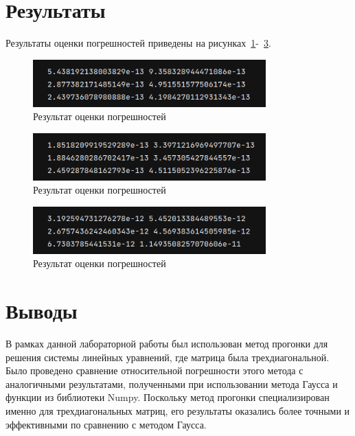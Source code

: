 \documentclass[a4paper, 14pt]{extarticle}
\begin{document}
\section{Результаты}

Результаты оценки погрешностей приведены на рисунках~\ref{fig:img1}-~\ref{fig:img3}.

\begin{figure}[H]
\centering
\includegraphics[width=0.8\textwidth]{images/res1.png}
\caption{Результат оценки погрешностей}
\label{fig:img1}
\end{figure}


\begin{figure}[H]
\centering
\includegraphics[width=0.8\textwidth]{images/res2.png}
\caption{Результат оценки погрешностей}
\label{fig:img2}
\end{figure}


\begin{figure}[H]
\centering
\includegraphics[width=0.8\textwidth]{images/res3.png}
\caption{Результат оценки погрешностей}
\label{fig:img3}
\end{figure}


\section{Выводы}
В рамках данной лабораторной работы был использован метод прогонки для решения системы линейных уравнений, где матрица была трехдиагональной. Было проведено сравнение относительной погрешности этого метода с аналогичными результатами, полученными при использовании метода Гаусса и функции из библиотеки Numpy. Поскольку метод прогонки специализирован именно для трехдиагональных матриц, его результаты оказались более точными и эффективными по сравнению с методом Гаусса.
\end{document}
